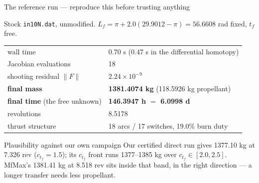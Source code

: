 \documentclass[10pt,aspectratio=169]{beamer}
\newcommand{\file}[1]{\texttt{\small #1}}
\newcommand{\Lf}{L_f}
\begin{document}
\begin{frame}{The reference run --- reproduce this before trusting anything}

Stock \file{in10N.dat}, unmodified. $\Lf = \pi + 2.0(29.9012-\pi) = 56.6608$
rad fixed, $t_f$ free.

\begin{center}
\begin{tabular}{@{}ll@{}}
\toprule
wall time & $0.70$ s ($0.47$ s in the differential homotopy)\\
Jacobian evaluations & 18\\
shooting residual $\|F\|$ & $2.24\times10^{-9}$\\
\textbf{final mass} & \textbf{1381.4074 kg} \; (118.5926 kg propellant)\\
\textbf{final time} (the free unknown) & \textbf{146.3947 h $=$ 6.0998 d}\\
revolutions & 8.5178\\
thrust structure & 18 arcs / 17 switches, 19.0\% burn duty\\
\bottomrule
\end{tabular}
\end{center}

\begin{block}{Plausibility against our own campaign}
Our certified direct run gives 1377.10 kg at 7.326 rev ($c_{t_f}=1.5$); its
$c_{t_f}$ front runs 1377--1385 kg over $c_{t_f}\in[2.0,2.5]$. MfMax's
1381.41 kg at 8.518 rev sits inside that band, in the right direction --- a
longer transfer needs less propellant.
\end{block}
\end{frame}
\end{document}

